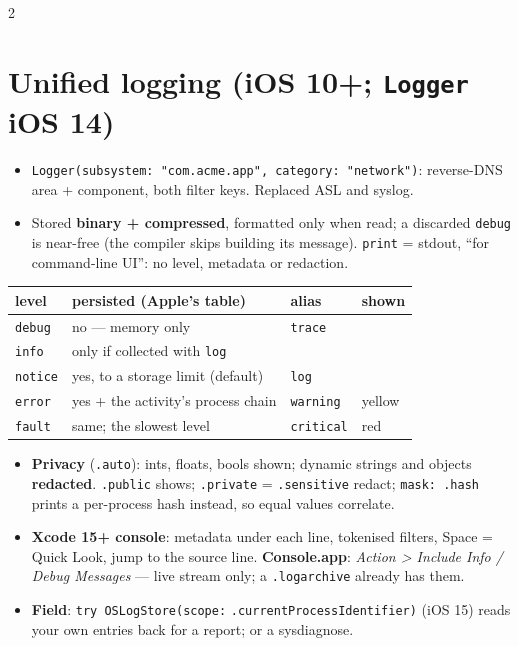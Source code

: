 \documentclass[8pt]{extarticle}
\newcommand\ct[1]{\texttt{#1}}
\begin{document}
\begin{multicols}{2}
\small{}\raggedright

\section{Unified logging (iOS 10+; \ct{Logger} iOS 14)}
\begin{itemize}
  \item \ct{Logger(subsystem: "com.acme.app", category: "network")}: reverse-DNS area +
        component, both filter keys. Replaced ASL and syslog.
  \item Stored \textbf{binary + compressed}, formatted only when read; a discarded \ct{debug}
        is near-free (the compiler skips building its message). \ct{print} = stdout, ``for
        command-line UI'': no level, metadata or redaction.
\end{itemize}
{\footnotesize\setlength{\tabcolsep}{3pt}
\begin{tabular}{@{}>{\raggedright\arraybackslash}p{12mm}>{\raggedright\arraybackslash}p{36mm}>{\raggedright\arraybackslash}p{13mm}>{\raggedright\arraybackslash}p{10mm}@{}}
\toprule
\textbf{level} & \textbf{persisted (Apple's table)} & \textbf{alias} & \textbf{shown}\\ \midrule
\ct{debug} & no — memory only & \ct{trace} & \\
\ct{info} & only if collected with \ct{log} & & \\
\ct{notice} & yes, to a storage limit (default) & \ct{log} & \\
\ct{error} & yes + the activity's process chain & \ct{warning} & yellow\\
\ct{fault} & same; the slowest level & \ct{critical} & red\\
\bottomrule
\end{tabular}}
\begin{itemize}
  \item \textbf{Privacy} (\ct{.auto}): ints, floats, bools shown; dynamic strings and objects
        \textbf{redacted}. \ct{.public} shows; \ct{.private} = \ct{.sensitive} redact;
        \ct{mask: .hash} prints a per-process hash instead, so equal values correlate.
  \item \textbf{Xcode 15+ console}: metadata under each line, tokenised filters, Space =
        Quick Look, jump to the source line. \textbf{Console.app}: \emph{Action > Include
        Info / Debug Messages} — live stream only; a \ct{.logarchive} already has them.
  \item \textbf{Field}: \ct{try OSLogStore(scope:} \ct{.currentProcessIdentifier)} (iOS 15)
        reads your own entries back for a report; or a sysdiagnose.
\end{itemize}


\end{multicols}
\end{document}
